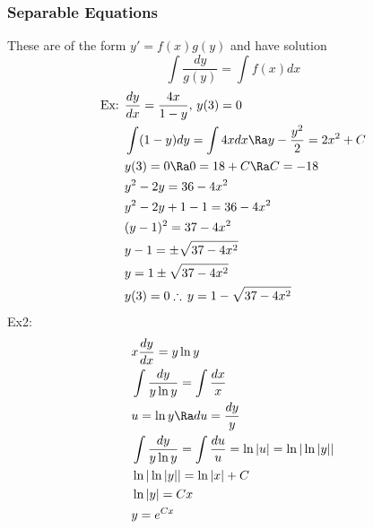 \subsubsection{Separable Equations}
These are of the form $y'=f(x)g(y)$ and have solution
$$\int\frac{dy}{g(y)}=\int f(x)dx$$
\begin{align*}
    \text{Ex: }&\frac{dy}{dx}=\frac{4x}{1-y},\,y(3)=0\\
    &\int(1-y)dy=\int 4xdx\Ra y-\frac{y^2}{2}=2x^2+C\\
    &y(3)=0\Ra0=18+C\Ra C=-18\\
    &y^2-2y=36-4x^2\\
    &y^2-2y+1-1=36-4x^2\\
    &(y-1)^2=37-4x^2\\
    &y-1=\pm\sqrt{37-4x^2}\\
    &y=1\pm\sqrt{37-4x^2}\\
    &y(3)=0\therefore\,y=1-\sqrt{37-4x^2}
\end{align*}
Ex2:
\begin{align*}
    &x\frac{dy}{dx}=y\ln y\\
    &\int\frac{dy}{y\ln y}=\int\frac{dx}{x}\\
    &u=\ln y\Ra du=\frac{dy}{y}\\
    &\int\frac{dy}{y\ln y}=\int\frac{du}{u}=\ln|u|=\ln|\ln|y||\\
    &\ln|\ln|y||=\ln |x|+C\\
    &\ln|y|=Cx\\
    &y=e^{Cx}
\end{align*}

